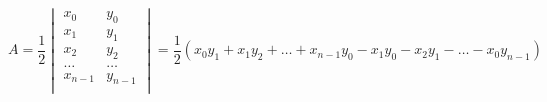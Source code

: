 \documentclass[12pt]{article}
\begin{document}
\[
    A = \frac{1}{2}\begin{vmatrix}
        x_0 & y_0 \\
        x_1 & y_1 \\
        x_2 & y_2 \\
        \ldots & \ldots \\
        x_{n-1} & y_{n-1} \\
    \end{vmatrix} = \frac{1}{2}(x_0y_1 + x_1y_2 + \ldots + x_{n-1}y_0 - x_1y_0 - x_2y_1 - \ldots - x_0y_{n-1})
\]
\end{document}

